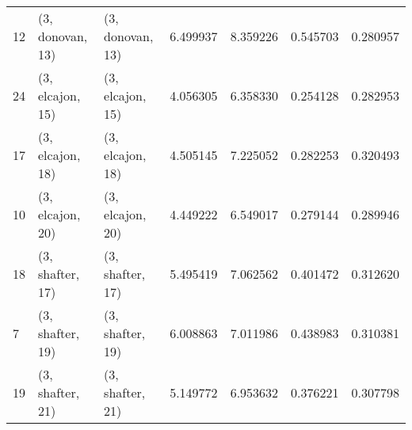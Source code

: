 \begin{tabular}{lllrrrr}
12 &  (3, donovan, 13) &  (3, donovan, 13) &  6.499937 &  8.359226 &   0.545703 &  0.280957 \\
24 &  (3, elcajon, 15) &  (3, elcajon, 15) &  4.056305 &  6.358330 &   0.254128 &  0.282953 \\
17 &  (3, elcajon, 18) &  (3, elcajon, 18) &  4.505145 &  7.225052 &   0.282253 &  0.320493 \\
10 &  (3, elcajon, 20) &  (3, elcajon, 20) &  4.449222 &  6.549017 &   0.279144 &  0.289946 \\
18 &  (3, shafter, 17) &  (3, shafter, 17) &  5.495419 &  7.062562 &   0.401472 &  0.312620 \\
7  &  (3, shafter, 19) &  (3, shafter, 19) &  6.008863 &  7.011986 &   0.438983 &  0.310381 \\
19 &  (3, shafter, 21) &  (3, shafter, 21) &  5.149772 &  6.953632 &   0.376221 &  0.307798 \\
\bottomrule
\end{tabular}
